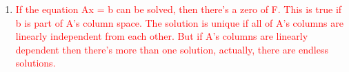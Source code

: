 \documentclass[11pt]{article}
\begin{document}
\begin{enumerate}
\begin{enumerate}
    \begin{enumerate}
        \item[\textcolor{red}{}] \textcolor{red}{
            If the equation Ax = b can be solved, then there's a zero of F. This is true if b is part of A's column space. The solution is unique if all of A's columns are linearly independent from each other. But if A's columns are linearly dependent then there's more than one solution, actually, there are endless solutions.
        }
    \end{enumerate}

    
  \end{enumerate}

\end{enumerate}
\end{document}
